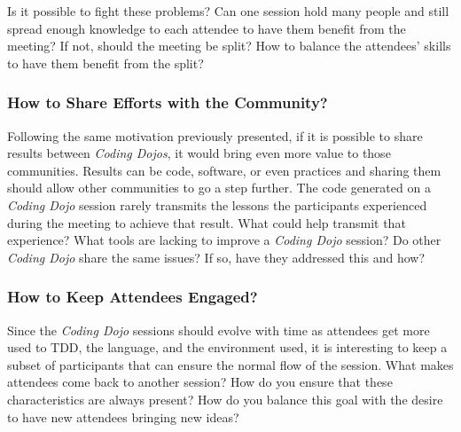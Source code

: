 Is it possible to fight these problems? Can one session hold many
people and still spread enough knowledge to each attendee to have them
benefit from the meeting? If not, should the meeting be split? How
to balance the attendees' skills to have them benefit from the split?

\subsubsection{How to Share Efforts with the Community?}

Following the same motivation previously presented, if it is possible
to share results between \emph{Coding Dojos}, it would bring even
more value to those communities. Results can be code, software, or
even practices and sharing them should allow other communities to go a
step further. 
The code generated on a \emph{Coding Dojo} session rarely
transmits the lessons the participants experienced during the meeting
to achieve that result.
What could help transmit that experience? What tools are lacking to
improve a \emph{Coding Dojo} session? Do other \emph{Coding Dojo}
share the same issues? If so, have they addressed this and how?

\subsubsection{How to Keep Attendees Engaged?}

Since the \textit{Coding Dojo} sessions should evolve with time as
attendees get more used to TDD, the language, and the environment used,
it is interesting to keep a subset of participants that can ensure the
normal flow of the session. What makes attendees come back to another
session? How do you ensure that these characteristics are always present?
How do you balance this goal with the desire to have new attendees bringing
new ideas?